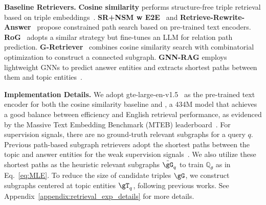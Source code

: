 \label{sec: retrieval_main}

\textbf{Baseline Retrievers.} 
\textbf{Cosine similarity} performs structure-free triple retrieval based on triple embeddings~\citep{li2023graph}. \textbf{SR+NSM w E2E}~\citep{zhang2022subgraph} and \textbf{Retrieve-Rewrite-Answer}~\citep{wu2023retrieve} propose constrained path search based on pre-trained text encoders. \textbf{RoG}~\citep{luo2024rog} adopts a similar strategy but fine-tunes an LLM for relation path prediction. \textbf{G-Retriever}~\citep{he2024g} combines cosine similarity search with combinatorial optimization to construct a connected subgraph. \textbf{GNN-RAG} employs lightweight GNNs to predict answer entities and extracts shortest paths between them and topic entities~\citep{mavromatis-karypis-2022-rearev, mavromatis2024gnn}.

\textbf{Implementation Details.} We adopt gte-large-en-v1.5~\citep{li2023towards} as the pre-trained text encoder for both the cosine similarity baseline and \proj, a 434M model that achieves a good balance between efficiency and English retrieval performance, as evidenced by the Massive Text Embedding Benchmark (MTEB) leaderboard~\citep{muennighoff-etal-2023-mteb}. For supervision signals, there are no ground-truth relevant subgraphs for a query $q$. Previous path-based subgraph retrievers adopt the shortest paths between the topic and answer entities for the weak supervision signals~\citep{zhang2022subgraph, luo2024rog}. We also utilize these shortest paths as the heuristic relevant subgraphs $\tilde{\gG}_q$ to train $\mathbb{Q}_{\theta}$ as in  Eq.~\ref{eq:MLE}. To reduce the size of candidate triples $\gG$, we construct subgraphs centered at topic entities $\gT_q$, following previous works. See Appendix~\ref{appendix:retrieval_exp_details} for more details.


